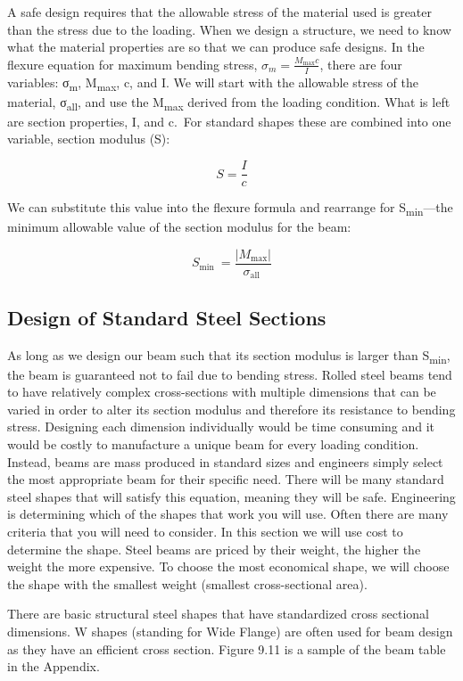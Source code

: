 \documentclass[
  letterpaper,
  DIV=11,
  numbers=noendperiod]{scrreprt}
\begin{document}
A safe design requires that the allowable stress of the material used is
greater than the stress due to the loading. When we design a structure,
we need to know what the material properties are so that we can produce
safe designs. In the flexure equation for maximum bending stress,
\(\sigma_m=\frac{M_{\max } c}{I}\), there are four variables:
σ\textsubscript{m}, M\textsubscript{max}, c, and I. We will start with
the allowable stress of the material, σ\textsubscript{all}, and use the
\textbar M\textsubscript{max}\textbar{} derived from the loading
condition. What is left are section properties, I, and c.~For standard
shapes these are combined into one variable, section modulus (S):

\[
S=\frac{I}{c}
\]

We can substitute this value into the flexure formula and rearrange for
S\textsubscript{min}---the minimum allowable value of the section
modulus for the beam:

\[
S_{\text {min }}=\frac{\left|M_{\max }\right|}{\sigma_{\text {all }}}
\]

\subsection{Design of Standard Steel
Sections}\label{design-of-standard-steel-sections}

As long as we design our beam such that its section modulus is larger
than S\textsubscript{min}, the beam is guaranteed not to fail due to
bending stress. Rolled steel beams tend to have relatively complex
cross-sections with multiple dimensions that can be varied in order to
alter its section modulus and therefore its resistance to bending
stress. Designing each dimension individually would be time consuming
and it would be costly to manufacture a unique beam for every loading
condition. Instead, beams are mass produced in standard sizes and
engineers simply select the most appropriate beam for their specific
need. There will be many standard steel shapes that will satisfy this
equation, meaning they will be safe. Engineering is determining which of
the shapes that work you will use. Often there are many criteria that
you will need to consider. In this section we will use cost to determine
the shape. Steel beams are priced by their weight, the higher the weight
the more expensive. To choose the most economical shape, we will choose
the shape with the smallest weight (smallest cross-sectional area).

There are basic structural steel shapes that have standardized cross
sectional dimensions. W shapes (standing for Wide Flange) are often used
for beam design as they have an efficient cross section. Figure 9.11 is
a sample of the beam table in the Appendix.
\end{document}
